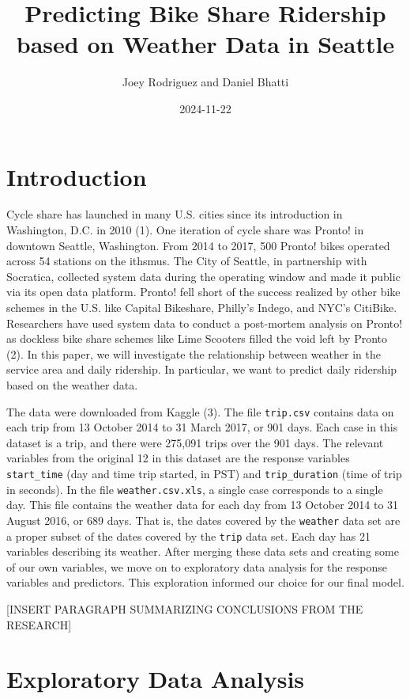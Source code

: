 \documentclass[
]{article}
\title{Predicting Bike Share Ridership based on Weather Data in Seattle}
\author{Joey Rodriguez and Daniel Bhatti}
\date{2024-11-22}
\begin{document}
\maketitle

\section{Introduction}\label{introduction}

Cycle share has launched in many U.S. cities since its introduction in
Washington, D.C. in 2010 (1). One iteration of cycle share was Pronto!
in downtown Seattle, Washington. From 2014 to 2017, 500 Pronto! bikes
operated across 54 stations on the ithsmus. The City of Seattle, in
partnership with Socratica, collected system data during the operating
window and made it public via its open data platform. Pronto! fell short
of the success realized by other bike schemes in the U.S. like Capital
Bikeshare, Philly's Indego, and NYC's CitiBike. Researchers have used
system data to conduct a post-mortem analysis on Pronto! as dockless
bike share schemes like Lime Scooters filled the void left by Pronto
(2). In this paper, we will investigate the relationship between weather
in the service area and daily ridership. In particular, we want to
predict daily ridership based on the weather data.

The data were downloaded from Kaggle (3). The file \texttt{trip.csv}
contains data on each trip from 13 October 2014 to 31 March 2017, or 901
days. Each case in this dataset is a trip, and there were 275,091 trips
over the 901 days. The relevant variables from the original 12 in this
dataset are the response variables \texttt{start\_time} (day and time
trip started, in PST) and \texttt{trip\_duration} (time of trip in
seconds). In the file \texttt{weather.csv.xls}, a single case
corresponds to a single day. This file contains the weather data for
each day from 13 October 2014 to 31 August 2016, or 689 days. That is,
the dates covered by the \texttt{weather} data set are a proper subset
of the dates covered by the \texttt{trip} data set. Each day has 21
variables describing its weather. After merging these data sets and
creating some of our own variables, we move on to exploratory data
analysis for the response variables and predictors. This exploration
informed our choice for our final model.

{[}INSERT PARAGRAPH SUMMARIZING CONCLUSIONS FROM THE RESEARCH{]}

\section{Exploratory Data Analysis}\label{exploratory-data-analysis}
\end{document}

